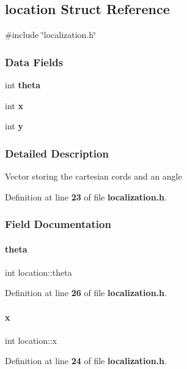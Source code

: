 \subsection{location Struct Reference}
\label{structlocation}


{\ttfamily \#include \char`\"{}localization.\+h\char`\"{}}

\subsubsection*{Data Fields}
\begin{DoxyCompactItemize}
\item 
int \textbf{ theta}
\item 
int \textbf{ x}
\item 
int \textbf{ y}
\end{DoxyCompactItemize}


\subsubsection{Detailed Description}
Vector storing the cartesian cords and an angle 

Definition at line \textbf{ 23} of file \textbf{ localization.\+h}.



\subsubsection{Field Documentation}
\mbox{\label{structlocation_a4b415222b4dcf34e49dacd22384be9eb}} 
\paragraph{theta}
{\footnotesize\ttfamily int location\+::theta}



Definition at line \textbf{ 26} of file \textbf{ localization.\+h}.

\mbox{\label{structlocation_aacd18b2506c49d221cfc37b2119e3c3c}} 
\paragraph{x}
{\footnotesize\ttfamily int location\+::x}



Definition at line \textbf{ 24} of file \textbf{ localization.\+h}.


